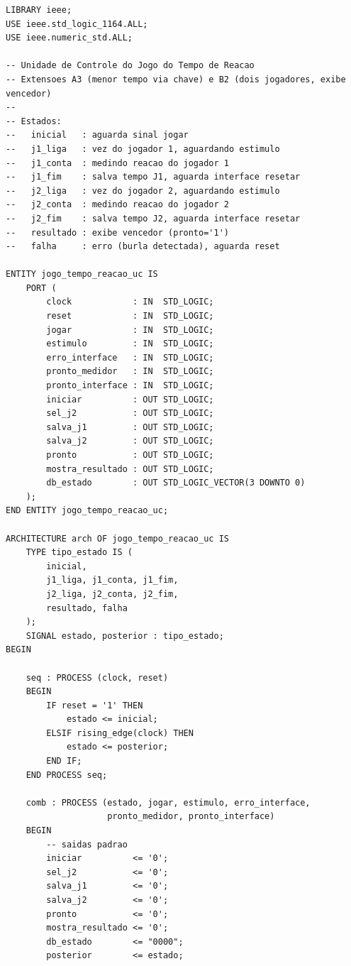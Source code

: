 \documentclass[12pt,a4paper]{article}
\begin{document}
\begin{lstlisting}[caption={Unidade de Controle -- \texttt{jogo\_tempo\_reacao\_uc.vhd}},
                   label={lst:uc}]
LIBRARY ieee;
USE ieee.std_logic_1164.ALL;
USE ieee.numeric_std.ALL;

-- Unidade de Controle do Jogo do Tempo de Reacao
-- Extensoes A3 (menor tempo via chave) e B2 (dois jogadores, exibe vencedor)
--
-- Estados:
--   inicial   : aguarda sinal jogar
--   j1_liga   : vez do jogador 1, aguardando estimulo
--   j1_conta  : medindo reacao do jogador 1
--   j1_fim    : salva tempo J1, aguarda interface resetar
--   j2_liga   : vez do jogador 2, aguardando estimulo
--   j2_conta  : medindo reacao do jogador 2
--   j2_fim    : salva tempo J2, aguarda interface resetar
--   resultado : exibe vencedor (pronto='1')
--   falha     : erro (burla detectada), aguarda reset

ENTITY jogo_tempo_reacao_uc IS
    PORT (
        clock            : IN  STD_LOGIC;
        reset            : IN  STD_LOGIC;
        jogar            : IN  STD_LOGIC;
        estimulo         : IN  STD_LOGIC;
        erro_interface   : IN  STD_LOGIC;
        pronto_medidor   : IN  STD_LOGIC;
        pronto_interface : IN  STD_LOGIC;
        iniciar          : OUT STD_LOGIC;
        sel_j2           : OUT STD_LOGIC;
        salva_j1         : OUT STD_LOGIC;
        salva_j2         : OUT STD_LOGIC;
        pronto           : OUT STD_LOGIC;
        mostra_resultado : OUT STD_LOGIC;
        db_estado        : OUT STD_LOGIC_VECTOR(3 DOWNTO 0)
    );
END ENTITY jogo_tempo_reacao_uc;

ARCHITECTURE arch OF jogo_tempo_reacao_uc IS
    TYPE tipo_estado IS (
        inicial,
        j1_liga, j1_conta, j1_fim,
        j2_liga, j2_conta, j2_fim,
        resultado, falha
    );
    SIGNAL estado, posterior : tipo_estado;
BEGIN

    seq : PROCESS (clock, reset)
    BEGIN
        IF reset = '1' THEN
            estado <= inicial;
        ELSIF rising_edge(clock) THEN
            estado <= posterior;
        END IF;
    END PROCESS seq;

    comb : PROCESS (estado, jogar, estimulo, erro_interface,
                    pronto_medidor, pronto_interface)
    BEGIN
        -- saidas padrao
        iniciar          <= '0';
        sel_j2           <= '0';
        salva_j1         <= '0';
        salva_j2         <= '0';
        pronto           <= '0';
        mostra_resultado <= '0';
        db_estado        <= "0000";
        posterior        <= estado;


\end{lstlisting}
\end{document}
